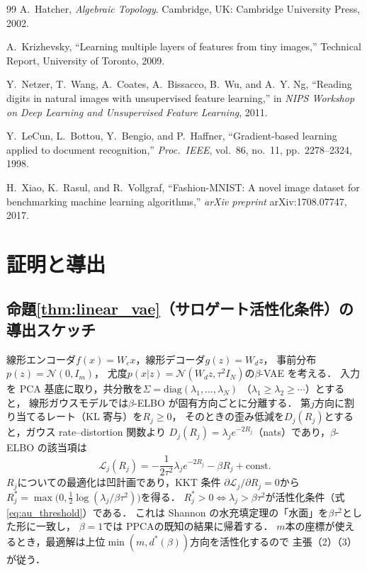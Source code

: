 \documentclass[11pt,a4paper]{jsarticle}
\newcommand{\dstar}{d^{*}(\beta)}
\begin{document}
\begin{thebibliography}{99}
A.~Hatcher,
\textit{Algebraic Topology}.
Cambridge, UK: Cambridge University Press, 2002.

A.~Krizhevsky,
``Learning multiple layers of features from tiny images,''
Technical Report, University of Toronto, 2009.

Y.~Netzer, T.~Wang, A.~Coates, A.~Bissacco, B.~Wu, and A.~Y. Ng,
``Reading digits in natural images with unsupervised feature learning,''
in \textit{NIPS Workshop on Deep Learning and Unsupervised Feature
Learning}, 2011.

Y.~LeCun, L.~Bottou, Y.~Bengio, and P.~Haffner,
``Gradient-based learning applied to document recognition,''
\textit{Proc.\ IEEE}, vol.~86, no.~11, pp.~2278--2324, 1998.

H.~Xiao, K.~Rasul, and R.~Vollgraf,
``Fashion-MNIST: A novel image dataset for benchmarking machine learning
algorithms,''
\textit{arXiv preprint} arXiv:1708.07747, 2017.

\end{thebibliography}

\appendix

\section{証明と導出}\label{app:proofs}

\subsection{命題\ref{thm:linear_vae}（サロゲート活性化条件）の導出スケッチ}

線形エンコーダ$f(x) = W_e x$，線形デコーダ$g(z) = W_d z$，
事前分布$p(z) = \mathcal{N}(0, I_m)$，
尤度$p(x|z) = \mathcal{N}(W_d z, \tau^2 I_N)$の$\beta$-VAE を考える．
入力を PCA 基底に取り，共分散を$\Sigma = \mathrm{diag}(\lambda_1, \ldots, \lambda_N)$
（$\lambda_1 \geq \lambda_2 \geq \cdots$）とすると，
線形ガウスモデルでは$\beta$-ELBO が固有方向ごとに分離する．
第$j$方向に割り当てるレート（KL 寄与）を$R_j \geq 0$，
そのときの歪み低減を$D_j(R_j)$とすると，ガウス rate--distortion 関数より
$D_j(R_j) = \lambda_j e^{-2R_j}$（nats）であり，$\beta$-ELBO の該当項は
\begin{equation}
  \mathcal{L}_j(R_j) = -\frac{1}{2\tau^2}\lambda_j e^{-2R_j} - \beta R_j + \text{const.}
\end{equation}
$R_j$についての最適化は凹計画であり，KKT 条件
$\partial \mathcal{L}_j / \partial R_j = 0$から
$R_j^* = \max\bigl(0, \tfrac{1}{2}\log(\lambda_j / \beta\tau^2)\bigr)$を得る．
$R_j^* > 0 \iff \lambda_j > \beta\tau^2$が活性化条件（式\eqref{eq:au_threshold}）である．
これは Shannon の水充填定理\cite{cover2006elements}の「水面」を$\beta\tau^2$とした形に一致し，
$\beta = 1$では PPCA\cite{tippingbishop1999ppca}の既知の結果に帰着する．
$m$本の座標が使えるとき，最適解は上位$\min(m, \dstar)$方向を活性化するので
主張（2）（3）が従う．
\end{document}
